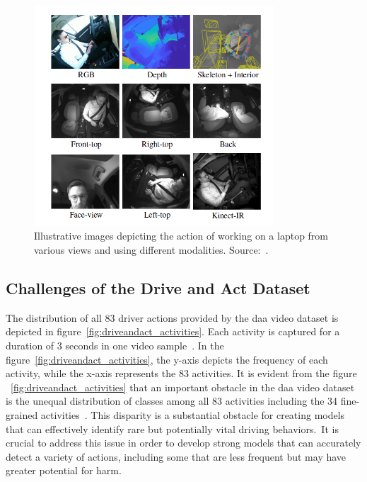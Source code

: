 \begin{figure}[h]
\begin{center}
\includegraphics[width=0.8\textwidth]{Images_Thesis/daa_images/Capture_views_thesis.PNG}
\end{center}
\caption[Illustrative images depicting the action of working on a laptop from various views and using different modalities.]{Illustrative images depicting the action of working on a laptop from various views and using different modalities. Source:~\citep{martin2019drive_and_act_2019_iccv}.}
\label{fig:driveandact_views_modalities}
\end{figure}

\subsection{Challenges of the Drive and Act Dataset}
\label{section:Disadvantages of Drive and Act Dataset}
The distribution of all 83 driver actions provided by the \gls{daa} video dataset is depicted in figure~\ref{fig:driveandact_activities}. Each activity is captured for a duration of 3 seconds in one video sample~\citep{martin2019drive_and_act_2019_iccv}. In the figure~\ref{fig:driveandact_activities}, the y-axis depicts the frequency of each activity, while the x-axis represents the 83 activities. It is evident from the figure ~\ref{fig:driveandact_activities} that an important obstacle in the \gls{daa} video dataset is the unequal distribution of classes among all 83 activities including the 34 fine-grained activities~\citep{martin2019drive_and_act_2019_iccv}. This disparity is a substantial obstacle for creating models that can effectively identify rare but potentially vital driving behaviors.~It is crucial to address this issue in order to develop strong models that can accurately detect a variety of actions, including some that are less frequent but may have greater potential for harm. 

